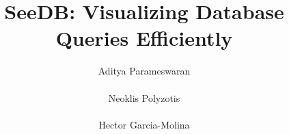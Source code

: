 \documentclass{sig-alternate}
\begin{document}
\newcommand{\SeeDB}{{\sf SeeDB}}
\newcommand{\calQ}{\mathcal{Q}}
\newcommand{\calR}{\mathcal{R}}
\newcommand{\att}[1]{{\text{#1}}}

\newtheorem{definition}{Definition}[section]
\newtheorem{example}[definition]{Example}
\newtheorem{goal}{Goal}[section]
\renewcommand{\baselinestretch}{0.995}





\newcommand{\squishlist}{
   \begin{list}{$\bullet$}
    { \setlength{\itemsep}{0pt}
      \setlength{\parsep}{2pt}
      \setlength{\topsep}{0pt}
      \setlength{\partopsep}{0pt}
      \leftmargin=25pt
\rightmargin=0pt
\labelsep=5pt
\labelwidth=10pt
\itemindent=0pt
\listparindent=0pt
\itemsep=\parsep
    }
}
\newcommand{\squishend}{\end{list}}

\newenvironment{denselist}{
    \begin{list}{\tiny{$\bullet$}}%
    {\setlength{\itemsep}{0ex} \setlength{\topsep}{0ex}
    \setlength{\parsep}{0pt} \setlength{\itemindent}{0pt}
    \setlength{\leftmargin}{0.5em}
    \setlength{\partopsep}{0pt}}}%
    {\end{list}}

\newcommand{\eat}[1]{}
\newcommand{\papertext}[1]{#1}
\newcommand{\techreport}[1]{}

\newcommand{\techreporttext}[1]{}
\newcommand{\stitle}[1]{\vspace{0.25em}\noindent\textbf{#1}}




\title{SeeDB: Visualizing Database Queries Efficiently\vspace{-5pt}}



\author{
\alignauthor
Aditya Parameswaran \\ 
 \\
\alignauthor Neoklis Polyzotis \\ 
 \\ 
\alignauthor Hector Garcia-Molina \\ 
 \\ 
}
\end{document}
